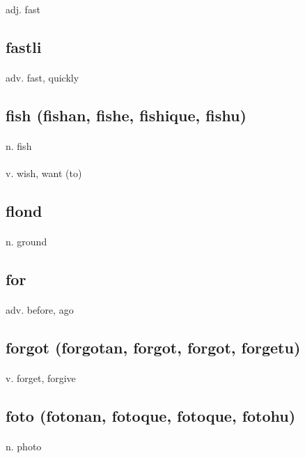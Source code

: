 \documentclass[UTF8]{article}
\begin{document}
    \paragraph{} adj. fast 
    \subsection{fastli}
    \paragraph{} adv. fast, quickly 
    \subsection{fish (fishan, fishe, fishique, fishu)}
    \paragraph{} n. fish 
    \paragraph{} v. wish, want (to) 
    \subsection{flond}
    \paragraph{} n. ground 
    \subsection{for}
    \paragraph{} adv. before, ago 
    \subsection{forgot (forgotan, forgot, forgot, forgetu)}
    \paragraph{} v. forget, forgive 
    \subsection{foto (fotonan, fotoque, fotoque, fotohu)}
    \paragraph{} n. photo 
\end{document}
